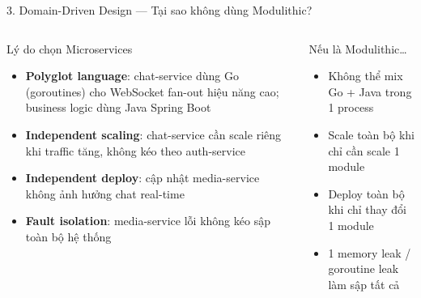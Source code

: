 \documentclass[aspectratio=169,compress]{beamer}
\begin{document}
\begin{frame}{3. Domain-Driven Design --- Tại sao không dùng Modulithic?}
\begin{columns}[T]
\begin{block}{Lý do chọn Microservices}
\begin{itemize}
  \item \textbf{Polyglot language}: chat-service dùng Go (goroutines) cho WebSocket fan-out hiệu năng cao; business logic dùng Java Spring Boot
  \item \textbf{Independent scaling}: chat-service cần scale riêng khi traffic tăng, không kéo theo auth-service
  \item \textbf{Independent deploy}: cập nhật media-service không ảnh hưởng chat real-time
  \item \textbf{Fault isolation}: media-service lỗi không kéo sập toàn bộ hệ thống
\end{itemize}
\end{block}

\begin{block}{Nếu là Modulithic\ldots}
\begin{itemize}
  \item Không thể mix Go + Java trong 1 process
  \item Scale toàn bộ khi chỉ cần scale 1 module
  \item Deploy toàn bộ khi chỉ thay đổi 1 module
  \item 1 memory leak / goroutine leak làm sập tất cả
\end{itemize}
\end{block}

\end{columns}
\end{frame}
\end{document}
